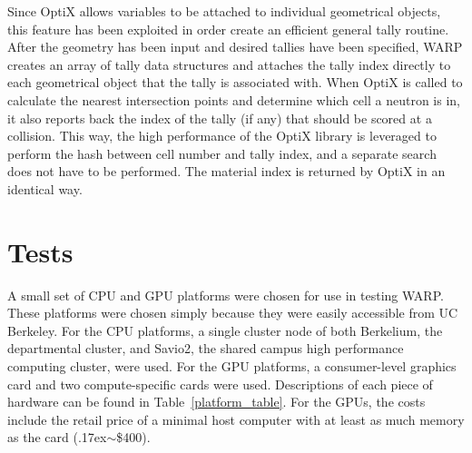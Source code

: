 \documentclass[preprint,12pt]{elsarticle}
\begin{document}
Since OptiX allows variables to be attached to individual geometrical objects, this feature has been exploited in order create an efficient general tally routine.  After the geometry has been input and desired tallies have been specified, WARP creates an array of tally data structures and attaches the tally index directly to each geometrical object that the tally is associated with.  When OptiX is called to calculate the nearest intersection points and determine which cell a neutron is in, it also reports back the index of the tally (if any) that should be scored at a collision.  This way, the high performance of the OptiX library is leveraged to perform the hash between cell number and tally index, and a separate search does not have to be performed.  The material index is returned by OptiX in an identical way.


\newpage
\section{Tests}
\label{sec:tests}

A small set of CPU and GPU platforms were chosen for use in testing WARP.  These platforms were chosen simply because they were easily accessible from UC Berkeley.  For the CPU platforms, a single cluster node of both Berkelium, the departmental cluster, and Savio2, the shared campus high performance computing cluster, were used.  For the GPU platforms, a consumer-level graphics card and two compute-specific cards were used.  Descriptions of each piece of hardware can be found in Table~\ref{platform_table}. For the GPUs, the costs include the retail price of a minimal host computer with at least as much memory as the card ({\raise.17ex\hbox{$\scriptstyle\sim$}}\$400).
  
\end{document}
